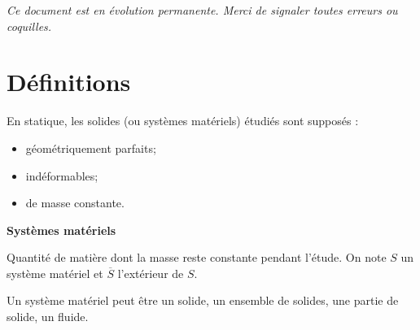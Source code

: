 \documentclass[10pt]{article}
\begin{document}
\tableofcontents

 \renewcommand{\baselinestretch}{1.2}
\setlength{\parskip}{2ex plus 0.5ex minus 0.2ex}

\textit{Ce document est en évolution permanente. Merci de signaler toutes
erreurs ou coquilles.}

\section{Définitions}

\begin{hypo}
En statique, les solides (ou systèmes matériels) étudiés sont supposés :
\begin{itemize}
\item géométriquement parfaits;
\item indéformables; 
\item de masse constante. 
\end{itemize}
\end{hypo}


\begin{defi}
\textbf{Systèmes matériels}

Quantité de matière dont la masse reste constante pendant l'étude. On note $S$ un système matériel et $\overline{S}$ l'extérieur de $S$.
\end{defi}

\begin{rem}
Un système matériel peut être un solide, un ensemble de solides, une partie de solide, un fluide.
\end{rem}
\end{document}
